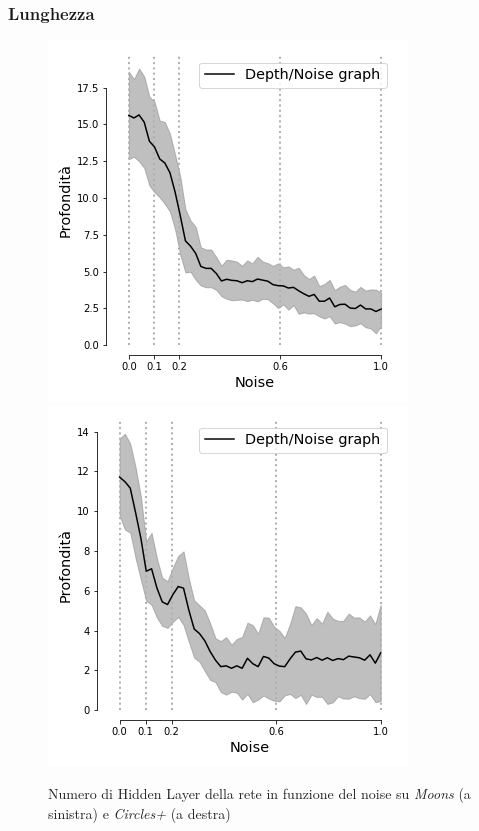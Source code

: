\documentclass{beamer}
\begin{document}
 \begin{frame}
 \frametitle{Lunghezza}
 \begin{figure}
 \includegraphics[scale = 0.42]{images/depth_noise_moons.png}
 \includegraphics[scale = 0.42]{images/depth_noise_circles+.png}
 \caption{\large Numero di Hidden Layer della rete in funzione del noise su \textit{Moons} (a sinistra) e \textit{Circles+} (a destra)} 
 \end{figure}
\end{frame}

% 
\end{document}
